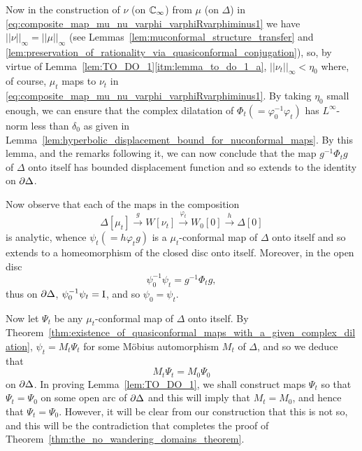 Now in the construction of $\nu$ (on $\mathbb{C}_\infty$) from $\mu$ (on $\Delta$) in
\eqref{eq:composite_map_mu_nu_varphi_varphiRvarphiminus1} we have
$||\nu||_\infty = ||\mu||_\infty$ (see
Lemmas~\ref{lem:muconformal_structure_transfer} and
\ref{lem:preservation_of_rationality_via_quasiconformal_conjugation}), so, by
virtue of Lemma~\ref{lem:TO_DO_1}\ref{itm:lemma_to_do_1_a}, $||\nu_t||_\infty <
\eta_0$ where, of course, $\mu_t$ maps to $\nu_t$ in
\eqref{eq:composite_map_mu_nu_varphi_varphiRvarphiminus1}. By taking $\eta_0$
small enough, we can ensure that the complex dilatation of $\Phi_t
(=\varphi_0^{-1} \varphi_t)$ has $L^\infty$-norm less than $\delta_0$ as given
in Lemma~\ref{lem:hyperbolic_displacement_bound_for_nuconformal_maps}. By this
lemma, and the remarks following it, we can now conclude that the map $g^{-1}
\Phi_t g$ of $\Delta$ onto itself has bounded displacement function and so
extends to the identity on $\partial {\Delta}$.

Now observe that each of the maps in the composition
\begin{equation*}
    \Delta[\mu_t] \xrightarrow{g} W[\nu_t] \xrightarrow{\varphi_t} W_0[0] \xrightarrow{h} \Delta[0]
\end{equation*}
is analytic, whence $\psi_t (= h \varphi_t g)$ is a $\mu_t$-conformal map of
$\Delta$ onto itself and so extends to a homeomorphism of the closed disc onto
itself. Moreover, in the open disc
\begin{equation*}
    \psi_0^{-1} \psi_t = g^{-1} \Phi_t g,
\end{equation*}
thus on $\partial {\Delta}$, $\psi_0^{-1} \psi_t = \mathrm{I}$, and so $\psi_0 =
\psi_t$.

Now let $\Psi_t$ be any $\mu_t$-conformal map of $\Delta$ onto itself. By
Theorem~\ref{thm:existence_of_quasiconformal_maps_with_a_given_complex_dilation},
$\psi_t = M_t \Psi_t$ for some Möbius automorphism $M_t$ of $\Delta$, and so we
deduce that
\begin{equation}
    \label{eq:mobius_automorphism_equality}
    M_t \Psi_t = M_0 \Psi_0
\end{equation}
on $\partial {\Delta}$. In proving Lemma~\ref{lem:TO_DO_1}, we shall construct
maps $\Psi_t$ so that $\Psi_t = \Psi_0$ on some open arc of $\partial {\Delta}$
and this will imply that $M_t = M_0$, and hence that $\Psi_t = \Psi_0$. However,
it will be clear from our construction that this is not so, and this will be the
contradiction that completes the proof of
Theorem~\ref{thm:the_no_wandering_domains_theorem}.

